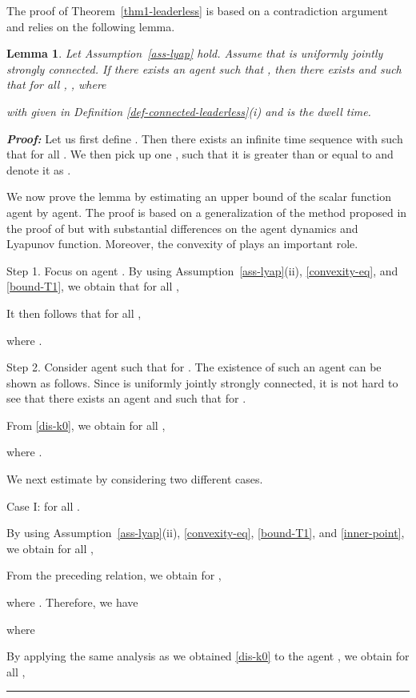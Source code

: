 \documentclass[a4paper, 11pt]{article}
\newtheorem{lemma}{Lemma}
\newenvironment{IEEEproof}[1][\bf Proof]{\smallskip\par\noindent\textit{#1: }}{\hspace*{\fill} \rule{6pt}{6pt}\smallskip}
\begin{document}
The proof of Theorem~\ref{thm1-leaderless} is based on a contradiction argument and
relies on the following lemma.
\begin{lemma}\label{lem1-thm1}
Let Assumption~\ref{ass-lyap} hold. Assume that  is uniformly jointly strongly connected.
If there exists an agent  such that
, then there exists  and  such that for all ,
, where

with  given in Definition \ref{def-connected-leaderless}(i) and  is the dwell time.
\end{lemma}
\begin{IEEEproof}
Let us first define .
Then there exists an infinite time sequence 
with  such that  for all .
We then pick up one ,  such that it is greater than or equal to 
and denote it as .

We now prove the lemma by estimating an upper bound of the scalar function  agent by agent.
The proof is based on a generalization of the method proposed in the proof of \cite[Lemma~4.3]{shi-johansson-hong}
but with substantial differences on the agent dynamics and Lyapunov function. Moreover, the convexity of  plays an important role.

\noindent Step 1. Focus on agent .
By using Assumption~\ref{ass-lyap}(ii), \eqref{convexity-eq}, and \eqref{bound-T1}, we obtain that for all ,

It then follows that for all ,

where .

\vspace{2mm}

\noindent Step 2. Consider agent  such that  for
. The existence of such an agent can be shown as follows.
Since  is uniformly jointly strongly connected, it is not hard to see
that there exists an agent  and  such that
 for .

From \eqref{dis-k0}, we obtain for all ,

where .


We next estimate  by considering two different cases.

Case I:  for all .

By using Assumption~\ref{ass-lyap}(ii), \eqref{convexity-eq}, \eqref{bound-T1}, and \eqref{inner-point}, we obtain for all ,


From the preceding relation, we obtain for ,

where .
Therefore, we have

where

By applying the same analysis as we obtained \eqref{dis-k0} to the agent ,
we obtain for all ,


\end{IEEEproof}
\end{document}
